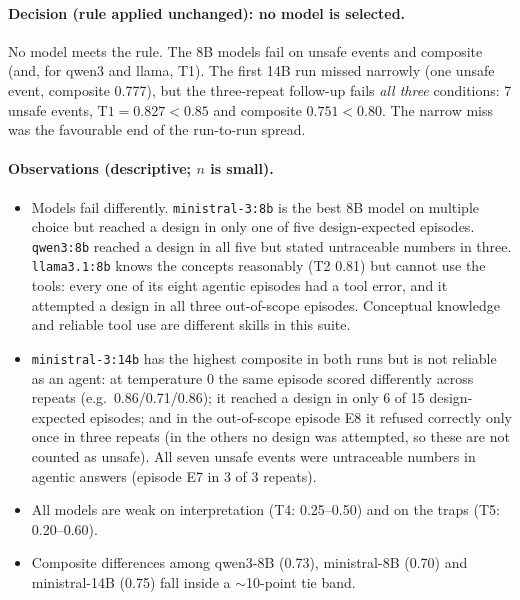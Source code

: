 \documentclass[a4paper,11pt]{article}
\begin{document}
\paragraph{Decision (rule applied unchanged): no model is selected.} No model meets the rule. The 8B models fail on unsafe events and composite (and, for qwen3 and llama, T1). The first 14B run missed narrowly (one unsafe event, composite 0.777), but the three-repeat follow-up fails \emph{all three} conditions: 7 unsafe events, $\mathrm{T1}=0.827<0.85$ and composite $0.751<0.80$. The narrow miss was the favourable end of the run-to-run spread.

\paragraph{Observations (descriptive; $n$ is small).}
\begin{itemize}[nosep]
\item Models fail differently. \texttt{ministral-3:8b} is the best 8B model on multiple choice but reached a design in only one of five design-expected episodes. \texttt{qwen3:8b} reached a design in all five but stated untraceable numbers in three. \texttt{llama3.1:8b} knows the concepts reasonably (T2 0.81) but cannot use the tools: every one of its eight agentic episodes had a tool error, and it attempted a design in all three out-of-scope episodes. Conceptual knowledge and reliable tool use are different skills in this suite.
\item \texttt{ministral-3:14b} has the highest composite in both runs but is not reliable as an agent: at temperature 0 the same episode scored differently across repeats (e.g.\ 0.86/0.71/0.86); it reached a design in only 6 of 15 design-expected episodes; and in the out-of-scope episode E8 it refused correctly only once in three repeats (in the others no design was attempted, so these are not counted as unsafe). All seven unsafe events were untraceable numbers in agentic answers (episode E7 in 3 of 3 repeats).
\item All models are weak on interpretation (T4: 0.25--0.50) and on the traps (T5: 0.20--0.60).
\item Composite differences among qwen3-8B (0.73), ministral-8B (0.70) and ministral-14B (0.75) fall inside a $\sim$10-point tie band.
\end{itemize}
\end{document}
